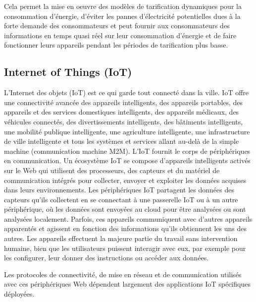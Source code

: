 \documentclass[french, a4paper, 12pt]{report}
\begin{document}
\begin{itemize}
Cela permet la mise en oeuvre des modèles de tarification dynamiques pour la consommation d'énergie, d’éviter les pannes d’électricité potentielles dues à la forte demande des consommateurs et peut fournir aux consommateurs des informations en temps quasi réel sur leur consommation d'énergie et de faire fonctionner leurs appareils pendant les périodes de tarification plus basse. 

\end{itemize}


\subsection{Internet of Things (IoT)}
L'Internet des objets (IoT) est ce qui garde tout connecté dans la ville. IoT offre une connectivité avancée des appareils intelligents, des appareils portables, des appareils et des services domestiques intelligents, des appareils médicaux, des véhicules connectés, des divertissements intelligents, des bâtiments intelligents, une mobilité publique intelligente, une agriculture intelligente, une infrastructure de ville intelligente et tous les systèmes et services allant au-delà de la simple machine (communication machine M2M).
L'IoT fournit le corps de périphériques en communication. Un écosystème IoT se compose d’appareils intelligents activés sur le Web qui utilisent des processeurs, des capteurs et du matériel de communication intégrés pour collecter, envoyer et exploiter les données acquises dans leurs environnements. 
Les périphériques IoT partagent les données des capteurs qu'ils collectent en se connectant à une passerelle IoT ou à un autre périphérique, où les données sont envoyées au cloud pour être analysées ou sont analysées localement. Parfois, ces appareils communiquent avec d’autres appareils apparentés et agissent en fonction des informations qu’ils obtiennent les uns des autres. Les appareils effectuent la majeure partie du travail sans intervention humaine, bien que les utilisateurs puissent interagir avec eux, par exemple pour les configurer, leur donner des instructions ou accéder aux données.

Les protocoles de connectivité, de mise en réseau et de communication utilisés avec ces périphériques Web dépendent largement des applications IoT spécifiques déployées.
\end{document}
